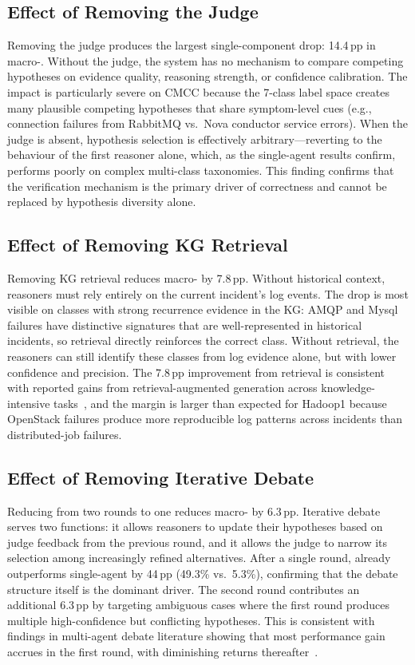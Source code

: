 \subsection{Effect of Removing the Judge}
Removing the judge produces the largest single-component drop: 14.4\,pp in macro-\fone{}.
Without the judge, the system has no mechanism to compare competing hypotheses on evidence
quality, reasoning strength, or confidence calibration. The impact is particularly severe on CMCC
because the 7-class label space creates many plausible competing hypotheses that share
symptom-level cues (e.g., connection failures from RabbitMQ vs.\ Nova conductor service errors).
When the judge is absent, hypothesis selection is effectively arbitrary---reverting to the
behaviour of the first reasoner alone, which, as the single-agent results confirm, performs
poorly on complex multi-class taxonomies. This finding confirms that the verification mechanism
is the primary driver of correctness and cannot be replaced by hypothesis diversity alone.

\subsection{Effect of Removing KG Retrieval}
Removing KG retrieval reduces macro-\fone{} by 7.8\,pp. Without historical context, reasoners
must rely entirely on the current incident's log events. The drop is most visible on classes with
strong recurrence evidence in the KG: AMQP and Mysql failures have distinctive signatures that
are well-represented in historical incidents, so retrieval directly reinforces the correct class.
Without retrieval, the reasoners can still identify these classes from log evidence alone, but
with lower confidence and precision. The 7.8\,pp improvement from retrieval is consistent with
reported gains from retrieval-augmented generation across knowledge-intensive
tasks~\cite{lewis2021retrievalaugmentedgenerationknowledgeintensivenlp}, and the margin is
larger than expected for Hadoop1 because OpenStack failures produce more reproducible log
patterns across incidents than distributed-job failures.

\subsection{Effect of Removing Iterative Debate}
Reducing from two rounds to one reduces macro-\fone{} by 6.3\,pp. Iterative debate serves two
functions: it allows reasoners to update their hypotheses based on judge feedback from the
previous round, and it allows the judge to narrow its selection among increasingly refined
alternatives. After a single round, \systemname{} already outperforms single-agent by 44\,pp
(49.3\% vs.\ 5.3\%), confirming that the debate structure itself is the dominant driver.
The second round contributes an additional 6.3\,pp by targeting ambiguous cases where the first
round produces multiple high-confidence but conflicting hypotheses. This is consistent with
findings in multi-agent debate literature showing that most performance gain accrues in the
first round, with diminishing returns
thereafter~\cite{du2023improvingfactualityreasoninglanguage}.

